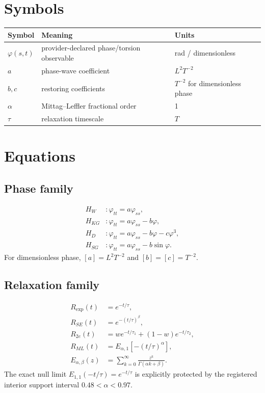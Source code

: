 \documentclass[11pt,a4paper]{article}
\begin{document}
\section{Symbols}
\begin{longtable}{lll}\toprule Symbol & Meaning & Units\\\midrule
$\varphi(s,t)$ & provider-declared phase/torsion observable & rad / dimensionless\\
$a$ & phase-wave coefficient & $L^2T^{-2}$\\
$b,c$ & restoring coefficients & $T^{-2}$ for dimensionless phase\\
$\alpha$ & Mittag--Leffler fractional order & 1\\
$\tau$ & relaxation timescale & $T$\\\bottomrule\end{longtable}

\section{Equations}
\subsection{Phase family}
\begin{align}
H_W &: \varphi_{tt}=a\varphi_{ss},\\
H_{KG} &: \varphi_{tt}=a\varphi_{ss}-b\varphi,\\
H_D &: \varphi_{tt}=a\varphi_{ss}-b\varphi-c\varphi^3,\\
H_{SG} &: \varphi_{tt}=a\varphi_{ss}-b\sin\varphi.
\end{align}
For dimensionless phase, $[a]=L^2T^{-2}$ and $[b]=[c]=T^{-2}$.

\subsection{Relaxation family}
\begin{align}
R_{\exp}(t)&=e^{-t/\tau},\\
R_{SE}(t)&=e^{-(t/\tau)^\beta},\\
R_{2e}(t)&=w e^{-t/\tau_1}+(1-w)e^{-t/\tau_2},\\
R_{ML}(t)&=E_{\alpha,1}[-(t/\tau)^\alpha],\\
E_{\alpha,\beta}(z)&=\sum_{k=0}^{\infty}\frac{z^k}{\Gamma(\alpha k+\beta)}.
\end{align}
The exact null limit $E_{1,1}(-t/\tau)=e^{-t/\tau}$ is explicitly protected by the registered interior support interval $0.48<\alpha<0.97$.
\end{document}
